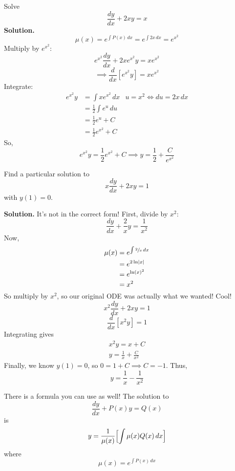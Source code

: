 \begin{Example}{}{}
    Solve
    \[ \frac{dy}{dx} +2xy=x \]
    \textbf{Solution.}
    \[ \mu(x)=e^{\int P(x)\, d{x}}=e^{\int 2x\, d{x}}=e^{x^2} \]
    Multiply by $ e^{x^2} $:
    \[ e^{x^2}\frac{dy}{dx} +2xe^{x^2}y=xe^{x^2} \]
    \[ \implies \frac{d}{dx} \left[ e^{x^2}y \right]=xe^{x^2} \]
    Integrate:
    \begin{align*}
        e^{x^2}y
         & =\int x e^{x^2}\, d{x}       & u=x^2\iff du=2x\,dx \\
         & =\frac{1}{2} \int e^u\, d{u}                       \\
         & =\frac{1}{2} e^{u}+C                               \\
         & =\frac{1}{2}e^{x^2}+C
    \end{align*}
    So,
    \[ e^{x^2}y=\frac{1}{2} e^{x^2}+C\implies y=\frac{1}{2} +\frac{C}{e^{x^2}} \]
\end{Example}

\begin{Example}{}{}
    Find a particular solution to
    \[ x \frac{dy}{dx} +2xy=1 \]
    with $ y(1)=0 $.

    \textbf{Solution.} It's not in the correct form! First, divide by $ x^2 $:
    \[ \frac{dy}{dx} +\frac{2}{x} y=\frac{1}{x^2}  \]
    Now,
    \begin{align*}
        \mu(x)
         & =e^{\int \sfrac{2}{x} \, d{x} } \\
         & =e^{2\ln\lvert x\rvert}                \\
         & =e^{\ln(x)^2}                   \\
         & =x^2
    \end{align*}
    So multiply by $ x^2 $, so our original ODE was actually what we wanted! Cool!
    \[ x^2 \frac{dy}{dx} +2xy=1 \]
    \[ \frac{d}{dx} \left[ x^2y \right]=1 \]
    Integrating gives
    \begin{align*}
        x^2 y=x+C \\
        y=\frac{1}{x} +\frac{C}{x^2}
    \end{align*}
    Finally, we know $ y(1)=0 $, so $ 0=1+C\implies C=-1 $. Thus,
    \[ y=\frac{1}{x} -\frac{1}{x^2} \]
\end{Example}

\begin{Remark}{}{}
    There is a formula you can use as well! The solution to
    \[ \frac{dy}{dx}+P(x)y=Q(x) \]
    is
    \[ y=\frac{1}{\mu(x)}\Bigl[\int \mu(x)Q(x)\, d{x} \Bigr]  \]
    where
    \[ \mu(x)=e^{\int P(x)\, d{x}} \]
\end{Remark}

